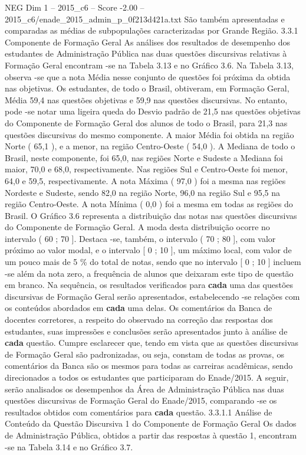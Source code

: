 \begin{textsample}{NEG Dim 1 – 2015\_c6 – Score -2.00 – 2015\_c6/enade\_2015\_admin\_p\_0f213d421a.txt}
São também apresentadas e comparadas as médias de subpopulações caracterizadas por Grande Região. 3.3.1 Componente de Formação Geral As análises dos resultados de desempenho dos estudantes de Administração Pública nas duas questões discursivas relativas à Formação Geral encontram -se na Tabela 3.13 e no Gráfico 3.6.
Na Tabela 3.13, observa -se que a nota Média nesse conjunto de questões foi próxima da obtida nas objetivas.
Os estudantes, de todo o Brasil, obtiveram, em Formação Geral, Média 59,4 nas questões objetivas e 59,9 nas questões discursivas.
No entanto, pode -se notar uma ligeira queda do Desvio padrão de 21,5 nas questões objetivas do Componente de Formação Geral dos alunos de todo o Brasil, para 21,3 nas questões discursivas do mesmo componente.
A maior Média foi obtida na região Norte ( 65,1 ), e a menor, na região Centro-Oeste ( 54,0 ).
A Mediana de todo o Brasil, neste componente, foi 65,0, nas regiões Norte e Sudeste a Mediana foi maior, 70,0 e 68,0, respectivamente.
Nas regiões Sul e Centro-Oeste foi menor, 64,0 e 59,5, respectivamente.
A nota Máxima ( 97,0 ) foi a mesma nas regiões Nordeste e Sudeste, sendo 82,0 na região Norte, 96,0 na região Sul e 95,5 na região Centro-Oeste.
A nota Mínima ( 0,0 ) foi a mesma em todas as regiões do Brasil.
O Gráfico 3.6 representa a distribuição das notas nas questões discursivas do Componente de Formação Geral.
A moda desta distribuição ocorre no intervalo ( 60 ; 70 ].
Destaca -se, também, o intervalo ( 70 ; 80 ], com valor próximo ao valor modal, e o intervalo [ 0 ; 10 ], um máximo local, com valor de um pouco mais de 5 \% do total de notas, sendo que no intervalo [ 0 ; 10 ] incluem -se além da nota zero, a frequência de alunos que deixaram este tipo de questão em branco.
Na sequência, os resultados verificados para \textbf{cada} uma das questões discursivas de Formação Geral serão apresentados, estabelecendo -se relações com os conteúdos abordados em \textbf{cada} uma delas.
Os comentários da Banca de docentes corretores, a respeito do observado na correção das respostas dos estudantes, suas impressões e conclusões serão apresentados junto à análise de \textbf{cada} questão.
Cumpre esclarecer que, tendo em vista que as questões discursivas de Formação Geral são padronizadas, ou seja, constam de todas as provas, os comentários da Banca são os mesmos para todas as carreiras acadêmicas, sendo direcionados a todos os estudantes que participaram do Enade/2015.
A seguir, serão analisados os desempenhos da Área de Administração Pública nas duas questões discursivas de Formação Geral do Enade/2015, comparando -se os resultados obtidos com comentários para \textbf{cada} questão. 3.3.1.1 Análise de Conteúdo da Questão Discursiva 1 do Componente de Formação Geral Os dados de Administração Pública, obtidos a partir das respostas à questão 1, encontram -se na Tabela 3.14 e no Gráfico 3.7.

\end{textsample}
